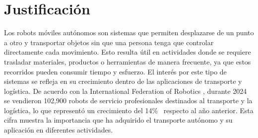 %

\chapter{Justificación}
\label{cap:proto-justificacion}

Los robots móviles autónomos son sistemas que permiten desplazarse de un punto a otro y transportar objetos sin que una persona tenga que controlar directamente cada movimiento. Esto resulta útil en actividades donde se requiere trasladar materiales, productos o herramientas de manera frecuente, ya que estos recorridos pueden consumir tiempo y esfuerzo. El interés por este tipo de sistemas se refleja en su crecimiento dentro de las aplicaciones de transporte y logística. De acuerdo con la International Federation of Robotics \cite{J3}, durante 2024 se vendieron 102,900 robots de servicio profesionales destinados al transporte y la logística, lo que representó un crecimiento del 14\% \  respecto al año anterior. Esta cifra muestra la importancia que ha adquirido el transporte autónomo y su aplicación en diferentes actividades.

